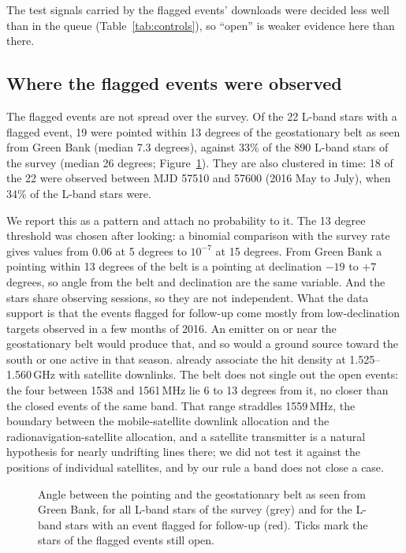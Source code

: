 \documentclass[twocolumn]{aastex631}
\begin{document}
The test signals carried by the flagged events' downloads were decided
less well than in the queue (Table~\ref{tab:controls}), so ``open'' is
weaker evidence here than there.

\subsection{Where the flagged events were observed} \label{sec:belt}

The flagged events are not spread over the survey. Of the 22 L-band stars
with a flagged event, 19 were pointed within 13 degrees of the
geostationary belt as seen from Green Bank (median 7.3 degrees), against
33\% of the 890 L-band stars of the survey (median 26 degrees;
Figure~\ref{fig:belt}). They are also clustered in time: 18 of the 22 were
observed between MJD 57510 and 57600 (2016 May to July), when 34\% of the
L-band stars were.

We report this as a pattern and attach no probability to it. The 13 degree
threshold was chosen after looking: a binomial comparison with the survey
rate gives values from 0.06 at 5 degrees to $10^{-7}$ at 15 degrees. From
Green Bank a pointing within 13 degrees of the belt is a pointing at
declination $-19$ to $+7$ degrees, so angle from the belt and declination
are the same variable. And the stars share observing sessions, so they are
not independent. What the data support is that the events flagged for
follow-up come mostly from low-declination targets observed in a few months
of 2016. An emitter on or near the geostationary belt would produce that,
and so would a ground source toward the south or one active in that season.
\citet{Price2020} already associate the hit density at 1.525--1.560\,GHz
with satellite downlinks. The belt does not single out the open events: the
four between 1538 and 1561\,MHz lie 6 to 13 degrees from it, no closer than
the closed events of the same band. That range straddles 1559\,MHz, the
boundary between the mobile-satellite downlink allocation and the
radionavigation-satellite allocation, and a satellite transmitter is a
natural hypothesis for nearly undrifting lines there; we did not test it
against the positions of individual satellites, and by our rule a band does
not close a case.

\begin{figure}
\caption{Angle between the pointing and the geostationary belt as seen from
Green Bank, for all L-band stars of the survey (grey) and for the L-band
stars with an event flagged for follow-up (red). Ticks mark the stars of
the flagged events still open. \label{fig:belt}}
\end{figure}
\end{document}
